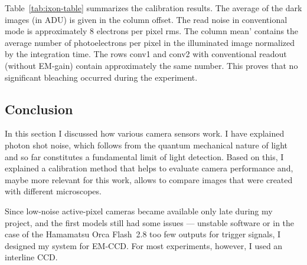 Table~\ref{tab:ixon-table} summarizes the calibration results. The
average of the dark images (in ADU) is given in the column
\textsf{offset}. The read noise in conventional mode is approximately
8 electrons per pixel rms. The column \textsf{mean'} contains the
average number of photoelectrons per pixel in the illuminated image
normalized by the integration time. The rows \textsf{conv1} and
\textsf{conv2} with conventional readout (without EM-gain) contain
approximately the same number. This proves that no significant
bleaching occurred during the experiment.

\subsection{Conclusion}

In this section I discussed how various camera sensors work. I have
explained photon shot noise, which follows from the quantum mechanical
nature of light and so far constitutes a fundamental limit of light
detection. Based on this, I explained a calibration method that helps
to evaluate camera performance and, maybe more relevant for this work,
allows to compare images that were created with different microscopes.

Since low-noise active-pixel cameras became available only late during
my project, and the first models still had some issues --- unstable
software or in the case of the Hamamatsu Orca Flash~2.8 too few
outputs for trigger signals, I designed my system for EM-CCD.  For
most experiments, however, I used an interline CCD.











